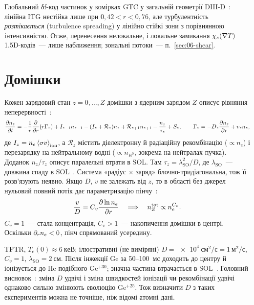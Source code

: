 \begin{corpusexample}
Глобальний δf-код частинок у комірках GTC у загальній геометрії DIII-D~\cite[с.~5, 15--18]{Wang2006}: лінійна ITG нестійка лише при $0{,}42<r<0{,}76$, але турбулентність \emph{розтікається} (turbulence spreading) у лінійно стійкі зони з порівнянною інтенсивністю. Отже, перенесення нелокальне, і локальне замикання $\chi_{s}(\nabla T)$ 1.5D-кодів~--- лише наближення; зональні потоки~--- п.~\ref{sec:06-shear}.
\end{corpusexample}

\section{Домішки}\label{sec:05-imp}

Кожен зарядовий стан $z=0,\dots,Z$ домішки з ядерним зарядом $Z$ описує рівняння неперервності~\cite[с.~4--7, (1), (3)--(5)]{Hulse1992}:
\begin{equation}\label{eq:05-hulse}
  \frac{\partial n_z}{\partial t}=-\frac1r\frac{\partial}{\partial r}(r\Gamma_z)+I_{z-1}n_{z-1}-(I_z+\mathcal{R}_z)n_z+\mathcal{R}_{z+1}n_{z+1}-\frac{n_z}{\tau_z}+S_z,\qquad \Gamma_z=-D_z\frac{\partial n_z}{\partial r}+v_zn_z,
\end{equation}
де $I_z=n_e\left\langle \sigma v \right\rangle_{\mathrm{ion}}$, а $\mathcal{R}_z$ містить діелектронну й радіаційну рекомбінацію ($\propto n_e$) і перезарядку на нейтральному водні ($\propto n_{\mathrm H^0}$, зокрема на нейтралах пучка). Доданок $n_z/\tau_z$ описує паралельні втрати в SOL. Там $\tau_z=\lambda_{\mathrm{SO}}^2/D$, де $\lambda_{\mathrm{SO}}$~--- довжина спаду в SOL~\cite[с.~10, (11)]{Hulse1992}. Система «радіус $\times$ заряд» блочно-тридіагональна, тож її розв'язують неявно. Якщо $D$, $v$ не залежать від $z$, то в області без джерел нульовий повний потік дає параметризацію пінчу~\cite[с.~9--10, (7)--(9)]{Hulse1992}:
\begin{equation}\label{eq:05-Cv}
  \frac{v}{D}=C_v\frac{\partial\ln n_e}{\partial r}\quad\Longrightarrow\quad n_Z^{\mathrm{tot}}\propto n_e^{C_v}.
\end{equation}
$C_v=1$~--- стала концентрація, $C_v>1$~--- накопичення домішки в центрі. Оскільки $\partial_rn_e<0$, пінч спрямований усередину.

\begin{corpusexample}
TFTR, $T_e(0)\approx\SI{6}{кеВ}$; ілюстративні (не виміряні) $D=\SI{e4}{см^2/с}=\SI{1}{м^2/с}$, $C_v=1$, $\lambda_{\mathrm{SO}}=\SI{2}{см}$. Після інжекції Ge за 50--100~мс доходить до центру й іонізується до He-подібного Ge$^{+30}$; значна частина втрачається в SOL~\cite[с.~11, 18]{Hulse1992}. Головний висновок~\cite[с.~22]{Hulse1992}: зміна $D$ удвічі і зміна швидкостей іонізації чи рекомбінації удвічі однаково сильно змінюють еволюцію Ge$^{+25}$. Тож визначити $D$ з таких експериментів можна не точніше, ніж відомі атомні дані.
\end{corpusexample}

